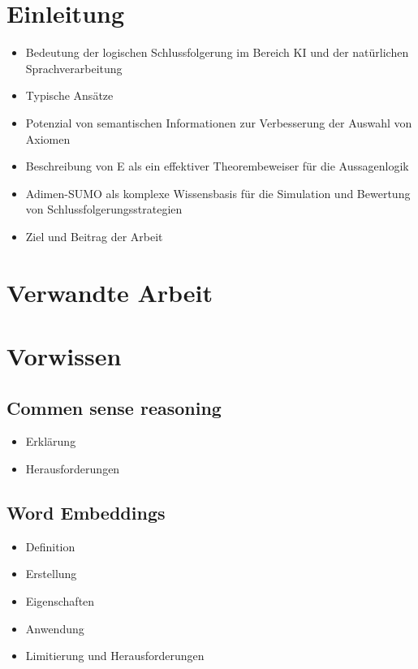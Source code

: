 \documentclass[german,version-2020-11]{uzl-thesis}
\begin{document}
%
%


\chapter{Einleitung}
  \begin{itemize}
    \item Bedeutung der logischen Schlussfolgerung im Bereich KI und der natürlichen Sprachverarbeitung
    \item Typische Ansätze
    \item Potenzial von semantischen Informationen zur Verbesserung der Auswahl von Axiomen
    \item Beschreibung von E als ein effektiver Theorembeweiser für die Aussagenlogik
    \item Adimen-SUMO als komplexe Wissensbasis für die Simulation und Bewertung von Schlussfolgerungsstrategien
    \item Ziel und Beitrag der Arbeit
  \end{itemize}
\chapter{Verwandte Arbeit}
%
\chapter{Vorwissen}
  \section{Commen sense reasoning}
    \begin{itemize}
      \item Erklärung
      \item Herausforderungen
    \end{itemize}
  \section{Word Embeddings}
    \begin{itemize}
      \item Definition
      \item Erstellung
      \item Eigenschaften
      \item Anwendung
      \item Limitierung und Herausforderungen
    \end{itemize}
\end{document}
